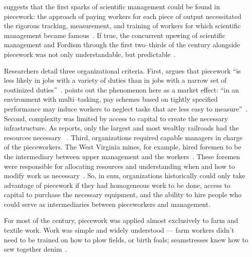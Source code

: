 \documentclass[trackingWork]{subfiles}
\begin{document}
\citeauthor{10.2307/23702539} suggests that the first sparks of scientific management
could be found in piecework:
the approach of paying workers for each piece of output necessitated
the rigorous tracking, measurement, and training of workers
for which scientific management became famous~\cite{10.2307/23702539}.
If true, 
the concurrent upswing of
scientific management and Fordism
through the first two--thirds of the  century
alongside piecework was not only understandable, but predictable~\cite{hart2013rise}.

Researchers detail three organizational criteria.
First, \citeauthor{Brown01041990} argues that
piecework ``is less likely in jobs with a variety of duties than in
jobs with a narrow set of routinized duties''~\cite{Brown01041990}.
\citeauthor{SJOE:SJOE371} points out the phenomenon here as a market effect:
``in an environment with multi--tasking,
pay schemes based on tightly specified performance may
induce workers to neglect tasks that are less easy to measure''~\cite{SJOE:SJOE371}.
Second,
complexity was limited by access to capital to create the necessary infrastructure.
As \citeauthor{10.2307/23702539} reports,
only the largest and most wealthy railroads had the resources
necessary
~\cite{10.2307/23702539}.
Third, organizations required capable managers in charge of the pieceworkers.
The West Virginia mines, for example, hired foremen 
to be the intermediary between upper management and the workers~\cite{10.2307/2118435}.
These foremen were responsible for allocating resources and
understanding when and how to modify work as necessary~\cite{wray1949marginal}.
So, in sum,
organizations historically could only take advantage of piecework if they had
homogeneous work to be done,
access to capital to purchase the necessary equipment, and
the ability to hire people who could serve as intermediaries between pieceworkers and management.

For most of the  century,
piecework was applied almost exclusively to farm and textile work.
Work was simple and widely understood
--- farm workers didn't need to be trained on how to plow fields, or birth foals;
seamstresses knew how to sew together denim~\cite{10.2307/2338394,riisOtherSideLives}.
\end{document}
